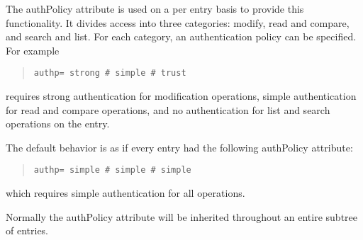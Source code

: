 The authPolicy attribute is used on a per entry basis to provide this
functionality.  It divides access into three categories: modify,
read and compare, and search and list.  For each category, an authentication
policy can be specified.  For example

\begin{quote}\small\begin{verbatim}
authp= strong # simple # trust
\end{verbatim}\end{quote}

requires strong authentication for modification operations, simple
authentication for read and compare operations, and no authentication
for list and search operations on the entry.

The default behavior is as if every entry had the following authPolicy
attribute:

\begin{quote}\small\begin{verbatim}
authp= simple # simple # simple
\end{verbatim}\end{quote}

which requires simple authentication for all operations.

Normally the authPolicy attribute will be inherited throughout an
entire subtree of entries.

